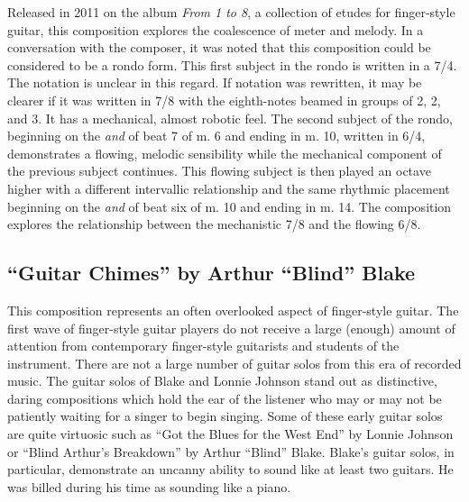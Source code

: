 \documentclass{tufte-handout}
\begin{document}
Released in 2011 on the album \emph{From 1 to 8}, a collection of etudes for finger-style guitar, this composition explores the coalescence of meter and melody. In a conversation with the composer, it was noted that this composition could be considered to be a rondo form. This first subject in the rondo is written in a 7/4. The notation is unclear in this regard. If notation was rewritten, it may be clearer if it was written in 7/8 with the eighth-notes beamed in groups of 2, 2, and 3. It has a mechanical, almost robotic feel. The second subject of the rondo, beginning on the \emph{and} of beat 7 of m. 6 and ending in m. 10, written in 6/4, demonstrates a flowing, melodic sensibility while the mechanical component of the previous subject continues. This flowing subject is then played an octave higher with a different intervallic relationship and the same rhythmic placement beginning on the \emph{and} of beat six of m. 10 and ending in m. 14. The composition explores the relationship between the mechanistic 7/8 and the flowing 6/8. 

\subsection*{``Guitar Chimes'' by Arthur ``Blind'' Blake}
This composition represents an often overlooked aspect of finger-style guitar. The first wave of finger-style guitar players do not receive a large (enough) amount of attention from contemporary finger-style guitarists and students of the instrument. There are not a large number of guitar solos from this era of recorded music. The guitar solos of Blake and Lonnie Johnson stand out as distinctive, daring compositions which hold the ear of the listener who may or may not be patiently waiting for a singer to begin singing. Some of these early guitar solos are quite virtuosic such as ``Got the Blues for the West End'' by Lonnie Johnson or ``Blind Arthur's Breakdown'' by Arthur ``Blind'' Blake. Blake's guitar solos, in particular, demonstrate an uncanny ability to sound like at least two guitars. He was billed during his time as sounding like a piano.
\end{document}
